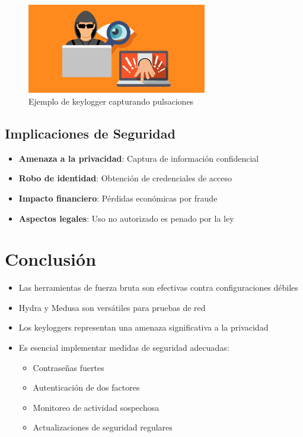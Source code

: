\documentclass[12pt,a4paper]{article}
\begin{document}
\begin{figure}[H]
    \centering
    \includegraphics[width=0.7\textwidth]{keylogger.png}
    \caption{Ejemplo de keylogger capturando pulsaciones}
    \label{fig:keylogger}
\end{figure}

\subsection{Implicaciones de Seguridad}
\begin{itemize}
    \item \textbf{Amenaza a la privacidad}: Captura de información confidencial
    \item \textbf{Robo de identidad}: Obtención de credenciales de acceso
    \item \textbf{Impacto financiero}: Pérdidas económicas por fraude
    \item \textbf{Aspectos legales}: Uso no autorizado es penado por la ley
\end{itemize}

\section{Conclusión}
\begin{itemize}
    \item Las herramientas de fuerza bruta son efectivas contra configuraciones débiles
    \item Hydra y Medusa son versátiles para pruebas de red
    \item Los keyloggers representan una amenaza significativa a la privacidad
    \item Es esencial implementar medidas de seguridad adecuadas:
    \begin{itemize}
        \item Contraseñas fuertes
        \item Autenticación de dos factores
        \item Monitoreo de actividad sospechosa
        \item Actualizaciones de seguridad regulares
    \end{itemize}
\end{itemize}
\end{document}
